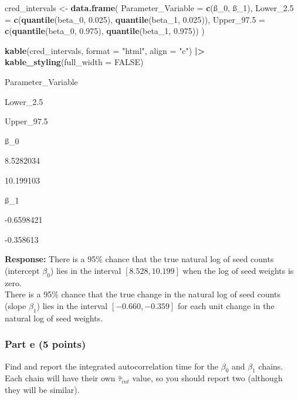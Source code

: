 \documentclass[
]{article}
\newenvironment{Shaded}{\begin{snugshade}}{\end{snugshade}}
\newcommand{\AttributeTok}[1]{\textcolor[rgb]{0.13,0.29,0.53}{#1}}
\newcommand{\ConstantTok}[1]{\textcolor[rgb]{0.56,0.35,0.01}{#1}}
\newcommand{\FloatTok}[1]{\textcolor[rgb]{0.00,0.00,0.81}{#1}}
\newcommand{\FunctionTok}[1]{\textcolor[rgb]{0.13,0.29,0.53}{\textbf{#1}}}
\newcommand{\NormalTok}[1]{#1}
\newcommand{\OtherTok}[1]{\textcolor[rgb]{0.56,0.35,0.01}{#1}}
\newcommand{\SpecialCharTok}[1]{\textcolor[rgb]{0.81,0.36,0.00}{\textbf{#1}}}
\newcommand{\StringTok}[1]{\textcolor[rgb]{0.31,0.60,0.02}{#1}}
\begin{document}
\begin{Shaded}
\begin{Highlighting}[]
\NormalTok{cred\_intervals }\OtherTok{\textless{}{-}} \FunctionTok{data.frame}\NormalTok{(}
  \AttributeTok{Parameter\_Variable =} \FunctionTok{c}\NormalTok{(}\StringTok{\textquotesingle{}ß\_0\textquotesingle{}}\NormalTok{, }\StringTok{\textquotesingle{}ß\_1\textquotesingle{}}\NormalTok{),}
  \AttributeTok{Lower\_2.5 =} \FunctionTok{c}\NormalTok{(}\FunctionTok{quantile}\NormalTok{(beta\_0, }\FloatTok{0.025}\NormalTok{), }\FunctionTok{quantile}\NormalTok{(beta\_1, }\FloatTok{0.025}\NormalTok{)),}
  \AttributeTok{Upper\_97.5 =} \FunctionTok{c}\NormalTok{(}\FunctionTok{quantile}\NormalTok{(beta\_0, }\FloatTok{0.975}\NormalTok{), }\FunctionTok{quantile}\NormalTok{(beta\_1, }\FloatTok{0.975}\NormalTok{))}
\NormalTok{)}

\FunctionTok{kable}\NormalTok{(cred\_intervals, }\AttributeTok{format =} \StringTok{"html"}\NormalTok{, }\AttributeTok{align =} \StringTok{"c"}\NormalTok{) }\SpecialCharTok{|\textgreater{}} 
  \FunctionTok{kable\_styling}\NormalTok{(}\AttributeTok{full\_width =} \ConstantTok{FALSE}\NormalTok{)}
\end{Highlighting}
\end{Shaded}

Parameter\_Variable

Lower\_2.5

Upper\_97.5

ß\_0

8.5282034

10.199103

ß\_1

-0.6598421

-0.358613

\textbf{Response:} There is a 95\% chance that the true natural log of
seed counts (intercept \(\beta_0\)) lies in the interval
\([8.528,10.199]\) when the log of seed weights is zero.\\
There is a 95\% chance that the true change in the natural log of seed
counts (slope \(\beta_1\)) lies in the interval \([-0.660, -0.359]\) for
each unit change in the natural log of seed weights.

\hypertarget{part-e-5-points}{%
\subsubsection{Part e (5 points)}\label{part-e-5-points}}

Find and report the integrated autocorrelation time for the \(\beta_0\)
and \(\beta_1\) chains. Each chain will have their own
\(\hat{\tau}_{int}\) value, so you should report two (although they will
be similar).
\end{document}
